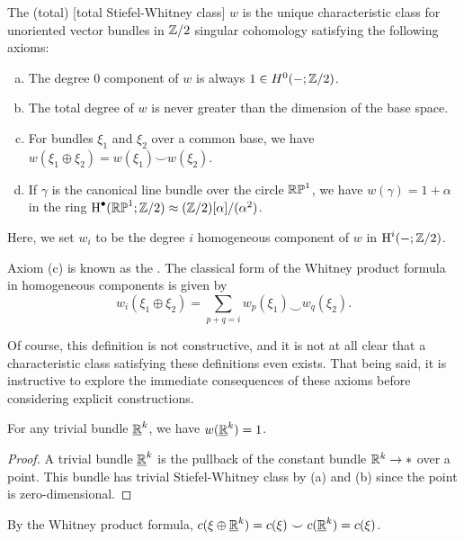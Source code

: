 \begin{definition}
	The (total) [total Stiefel-Whitney class] $w$ is the unique characteristic class for unoriented vector bundles in $\mathbb{Z}/2$ singular cohomology satisfying the following axioms:
	\begin{enumerate}[(a)]
		\item The degree $0$ component of $w$ is always $1\in H^0(-; \mathbb{Z}/2)$.
		\item The total degree of $w$ is never greater than the dimension of the base space.
		\item For bundles $\xi_1$ and $\xi_2$ over a common base, we have $w(\xi_1\oplus \xi_2)=w(\xi_1)\smile w(\xi_2)$.
		\item If $\gamma$ is the canonical line bundle over the circle $\mathbb{RP}^1$, we have $w(\gamma)=1+\alpha$ in the ring $\operatorname{H}^\bullet(\mathbb{RP}^1; \mathbb{Z}/2)\approx (\mathbb{Z}/2)[\alpha]/(\alpha^2)$.
	\end{enumerate}
	Here, we set $w_i$ to be the degree $i$ homogeneous component of $w$ in $\operatorname{H}^i(-;\mathbb{Z}/2)$.
\end{definition}

\begin{remark}
	Axiom (c) is known as the . The classical form of the Whitney product formula in homogeneous components is given by
	\[
		w_i(\xi_1\oplus \xi_2) = \sum_{p+q=i} w_p(\xi_1)\smile w_q(\xi_2).
	\]
\end{remark}

Of course, this definition is not constructive, and it is not at all clear that a characteristic class satisfying these definitions even exists. That being said, it is instructive to explore the immediate consequences of these axioms before considering explicit constructions.

\begin{corollary}
	For any trivial bundle $\underline{\mathbb{R}}^k$, we have $w(\underline{\mathbb{R}}^k)=1$.
\end{corollary}
\begin{proof}
	A trivial bundle $\underline{\mathbb{R}}^k$ is the pullback of the constant bundle $\mathbb{R}^k\to *$ over a point. This bundle has trivial Stiefel-Whitney class by (a) and (b) since the point is zero-dimensional.
\end{proof}

\begin{corollary}
	By the Whitney product formula, $c(\xi\oplus \underline{\mathbb{R}}^k)=c(\xi)\smile c(\underline{\mathbb{R}}^k)= c(\xi)$.
\end{corollary}

